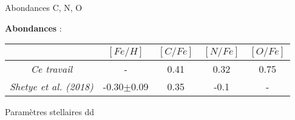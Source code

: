\documentclass[10pt]{beamer}
\begin{document}
\begin{frame}[fragile]{Abondances C, N, O}

\textbf{Abondances} : 
	\begin{table}
    		\begin{tabular}{c|cccc}
      		\toprule
			\midrule
       		&$[Fe/H]$ & $[C/Fe]$ & $[N/Fe]$&$ [O/Fe]$\\
      		\midrule
			\textit{Ce travail} & - & 0.41 &0.32 & 0.75  \\
      		\textit{Shetye et al. (2018)} &-0.30$\pm$0.09& 0.35 &-0.1 &-  \\
            \bottomrule
    		\end{tabular}
	  \end{table}

\end{frame}

\begin{frame}[fragile]{Paramètres stellaires}
    dd
\end{frame}
\end{document}
